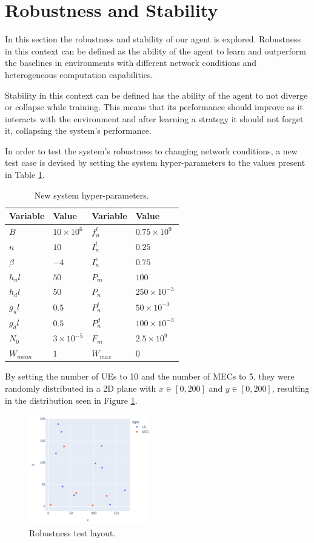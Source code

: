 \section{Robustness and Stability} \label{robustness_stability}

In this section the robustness and stability of our agent is explored. Robustness in this context can be defined as the ability of the agent to learn and outperform the baselines in environments with different network conditions and heterogeneous computation capabilities. 

Stability in this context can be defined has the ability of the agent to not diverge or collapse while training. This means that its performance should improve as it interacts with the environment and after learning a strategy it should not forget it, collapsing the system's performance.

In order to test the system's robustness to changing network conditions, a new test case is devised by setting the system hyper-parameters to the values present in Table \ref{new_hyperparams}.

\begin{table}[H]
\centering
\begin{tabular}{|l|l|l|l|}
\hline
Variable             & Value & Variable                & Value \\ \hline
$B$&$10\times10^{6}$&$f_n^l$&$0.75\times10^{9}$\\
$n$&$10$&$I_n^t$&$0.25$\\
$\beta$&$-4$&$I_n^e$&$0.75$\\
$h_ul$&$50$& $P_m$&$100$\\
$h_dl$&$50$& $P_n$& $250\times10^{-3}$\\
$g_ul$&$0.5$&$P_n^i$&$50\times10^{-3}$\\
$g_dl$&$0.5$&$P_n^d$&$100\times10^{-3}$\\
$N_0$&$3\times10^{-5}$&$F_m$&$2.5\times10^{9}$\\
$W_{mean}$&$1$&$W_{max}$&$0$\\ \hline
\end{tabular}
\caption{New system hyper-parameters.}\label{new_hyperparams}
\end{table}

By setting the number of \acrshort{UE}s to 10 and the number of \acrshort{MEC}s to 5, they were randomly distributed in a 2D plane with $x \in [0, 200]$ and $y \in [0, 200]$, resulting in the distribution seen in Figure \ref{robust_test}.

\begin{figure}[H]
  \centering
  \includegraphics[width=200px]{images/5_10_layout.png}
  \caption{Robustness test layout.}  \label{robust_test}
\end{figure}

